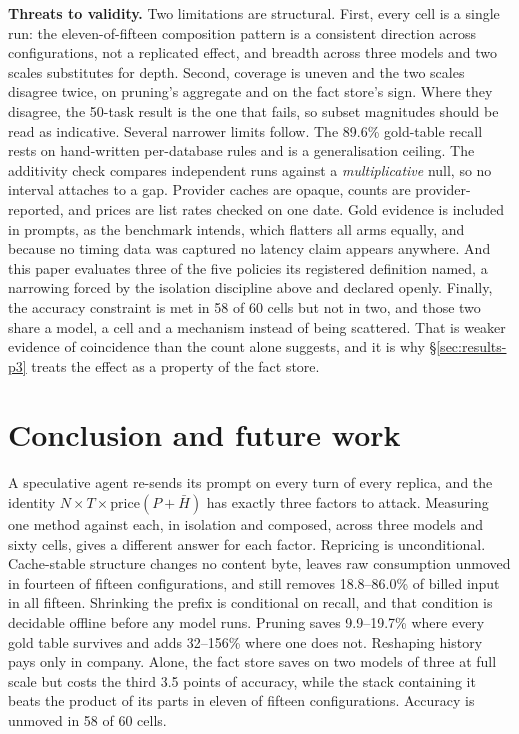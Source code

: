 \documentclass[conference]{IEEEtran}
\begin{document}
\textbf{Threats to validity.} Two limitations are structural. First, every cell
is a single run: the eleven-of-fifteen composition pattern is a consistent
direction across configurations, not a replicated effect, and breadth across
three models and two scales substitutes for depth. Second, coverage is uneven and the
two scales disagree twice, on pruning's aggregate and on the fact store's sign.
Where they disagree, the 50-task result is the one that fails, so subset
magnitudes should be read as indicative. Several narrower limits follow. The 89.6\% gold-table recall rests on
hand-written per-database rules and is a generalisation ceiling. The additivity
check compares independent runs against a \emph{multiplicative} null, so no
interval attaches to a gap. Provider caches are opaque, counts are
provider-reported, and prices are list rates checked on one date. Gold evidence
is included in prompts, as the benchmark intends, which flatters all arms
equally, and because no timing data was captured no latency claim appears
anywhere. And this paper
evaluates three of the five policies its registered definition named, a
narrowing forced by the isolation discipline above and declared openly. Finally, the
accuracy constraint is met in 58 of 60 cells but not in two, and those two share
a model, a cell and a mechanism instead of being scattered. That is weaker
evidence of coincidence than the count alone suggests, and it is why
§\ref{sec:results-p3} treats the effect as a property of the fact store.

\section{Conclusion and future work}\label{sec:conclusion}

A speculative agent re-sends its prompt on every turn of every replica, and the
identity $N \times T \times \mathrm{price}(P + \bar{H})$ has exactly three
factors to attack. Measuring one method against each, in isolation and composed,
across three models and sixty cells, gives a different answer for each factor.
Repricing is unconditional. Cache-stable structure changes no content byte,
leaves raw consumption unmoved in fourteen of fifteen configurations, and still
removes 18.8--86.0\% of billed input in all fifteen. Shrinking the prefix is
conditional on recall, and that condition is decidable offline before any model
runs. Pruning saves 9.9--19.7\% where every gold table survives and adds
32--156\% where one does not. Reshaping history pays only in company. Alone, the
fact store saves on two models of three at full scale but costs the third 3.5
points of accuracy, while the stack containing it beats the product of its parts
in eleven of fifteen configurations. Accuracy is unmoved in 58 of 60 cells.
\end{document}
